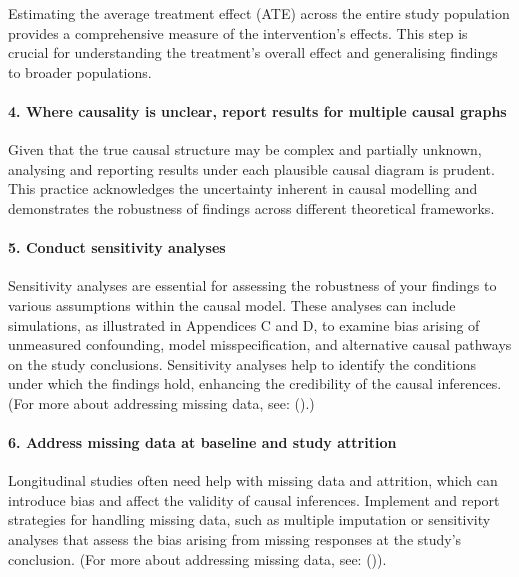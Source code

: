 \documentclass[
  singlecolumn]{article}
\let\oldparagraph\paragraph
\renewcommand{\paragraph}[1]{\oldparagraph{#1}\mbox{}}
\begin{document}
Estimating the average treatment effect (ATE) across the entire study
population provides a comprehensive measure of the intervention's
effects. This step is crucial for understanding the treatment's overall
effect and generalising findings to broader populations.

\paragraph{4. Where causality is unclear, report results for multiple
causal
graphs}\label{where-causality-is-unclear-report-results-for-multiple-causal-graphs}

Given that the true causal structure may be complex and partially
unknown, analysing and reporting results under each plausible causal
diagram is prudent. This practice acknowledges the uncertainty inherent
in causal modelling and demonstrates the robustness of findings across
different theoretical frameworks.

\paragraph{5. Conduct sensitivity
analyses}\label{conduct-sensitivity-analyses}

Sensitivity analyses are essential for assessing the robustness of your
findings to various assumptions within the causal model. These analyses
can include simulations, as illustrated in Appendices C and D, to
examine bias arising of unmeasured confounding, model misspecification,
and alternative causal pathways on the study conclusions. Sensitivity
analyses help to identify the conditions under which the findings hold,
enhancing the credibility of the causal inferences. (For more about
addressing missing data, see:
().)

\paragraph{6. Address missing data at baseline and study
attrition}\label{address-missing-data-at-baseline-and-study-attrition}

Longitudinal studies often need help with missing data and attrition,
which can introduce bias and affect the validity of causal inferences.
Implement and report strategies for handling missing data, such as
multiple imputation or sensitivity analyses that assess the bias arising
from missing responses at the study's conclusion. (For more about
addressing missing data, see:
()).
\end{document}
